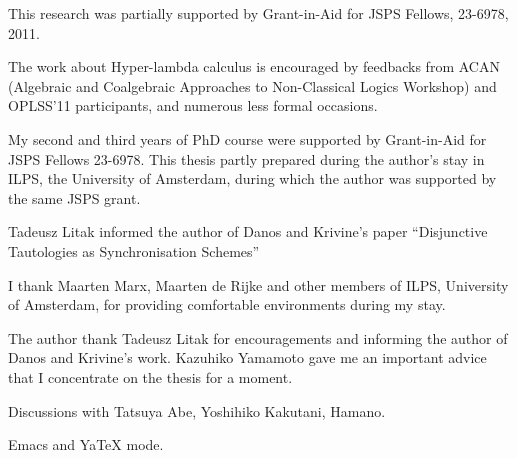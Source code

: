 \begin{acknowledge}
 This research was partially supported by
 Grant-in-Aid for JSPS Fellows, 23-6978, 2011.

 The work about Hyper-lambda calculus is encouraged by feedbacks from
 ACAN (Algebraic and Coalgebraic
 Approaches to
 Non-Classical Logics Workshop) and OPLSS'11 participants,
 and numerous less formal occasions.

 My second and third years of PhD course were
 supported by Grant-in-Aid for JSPS Fellows 23-6978.
 This thesis partly prepared during the author's stay in
 ILPS, the University of Amsterdam, during which the author was supported
 by the same JSPS grant.

 Tadeusz Litak informed the author of Danos and Krivine's paper
 ``Disjunctive Tautologies as Synchronisation Schemes''

 I thank Maarten Marx, Maarten de Rijke and other members of ILPS,
 University of Amsterdam, for providing
 comfortable environments during my stay.

 The author thank Tadeusz Litak for encouragements and
 informing the author of Danos and Krivine's work.
 Kazuhiko Yamamoto gave me an important advice that I concentrate on the
 thesis for a moment.

 Discussions with Tatsuya Abe, Yoshihiko Kakutani,  Hamano.

 Emacs and YaTeX mode.
\end{acknowledge}
